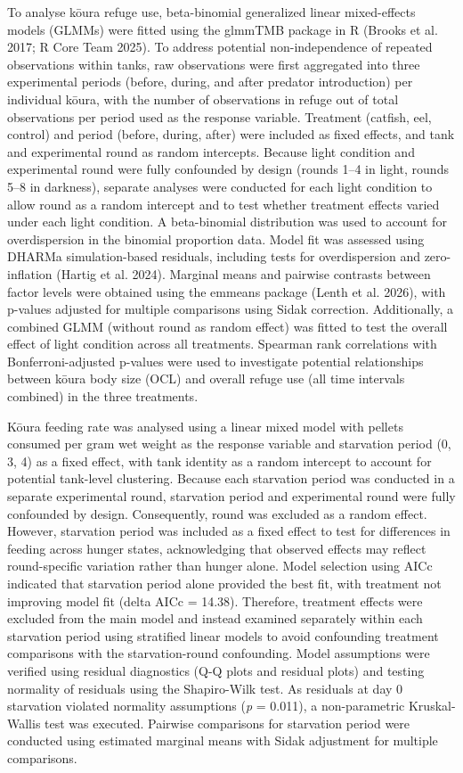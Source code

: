 \documentclass[
  12pt,
  a4paper,
]{scrbook}
\begin{document}
To analyse kōura refuge use, beta-binomial generalized linear
mixed-effects models (GLMMs) were fitted using the glmmTMB package in R
(Brooks et al. 2017; R Core Team 2025). To address potential
non-independence of repeated observations within tanks, raw observations
were first aggregated into three experimental periods (before, during,
and after predator introduction) per individual kōura, with the number
of observations in refuge out of total observations per period used as
the response variable. Treatment (catfish, eel, control) and period
(before, during, after) were included as fixed effects, and tank and
experimental round as random intercepts. Because light condition and
experimental round were fully confounded by design (rounds 1--4 in
light, rounds 5--8 in darkness), separate analyses were conducted for
each light condition to allow round as a random intercept and to test
whether treatment effects varied under each light condition. A
beta-binomial distribution was used to account for overdispersion in the
binomial proportion data. Model fit was assessed using DHARMa
simulation-based residuals, including tests for overdispersion and
zero-inflation ({Hartig et al.} 2024). Marginal means and pairwise
contrasts between factor levels were obtained using the emmeans package
(Lenth et al. 2026), with p-values adjusted for multiple comparisons
using Sidak correction. Additionally, a combined GLMM (without round as
random effect) was fitted to test the overall effect of light condition
across all treatments. Spearman rank correlations with
Bonferroni-adjusted p-values were used to investigate potential
relationships between kōura body size (OCL) and overall refuge use (all
time intervals combined) in the three treatments.

Kōura feeding rate was analysed using a linear mixed model with pellets
consumed per gram wet weight as the response variable and starvation
period (0, 3, 4) as a fixed effect, with tank identity as a random
intercept to account for potential tank-level clustering. Because each
starvation period was conducted in a separate experimental round,
starvation period and experimental round were fully confounded by
design. Consequently, round was excluded as a random effect. However,
starvation period was included as a fixed effect to test for differences
in feeding across hunger states, acknowledging that observed effects may
reflect round-specific variation rather than hunger alone. Model
selection using AICc indicated that starvation period alone provided the
best fit, with treatment not improving model fit (delta AICc = 14.38).
Therefore, treatment effects were excluded from the main model and
instead examined separately within each starvation period using
stratified linear models to avoid confounding treatment comparisons with
the starvation-round confounding. Model assumptions were verified using
residual diagnostics (Q-Q plots and residual plots) and testing
normality of residuals using the Shapiro-Wilk test. As residuals at day
0 starvation violated normality assumptions (\emph{p} = 0.011), a
non-parametric Kruskal-Wallis test was executed. Pairwise comparisons
for starvation period were conducted using estimated marginal means with
Sidak adjustment for multiple comparisons.
\end{document}

